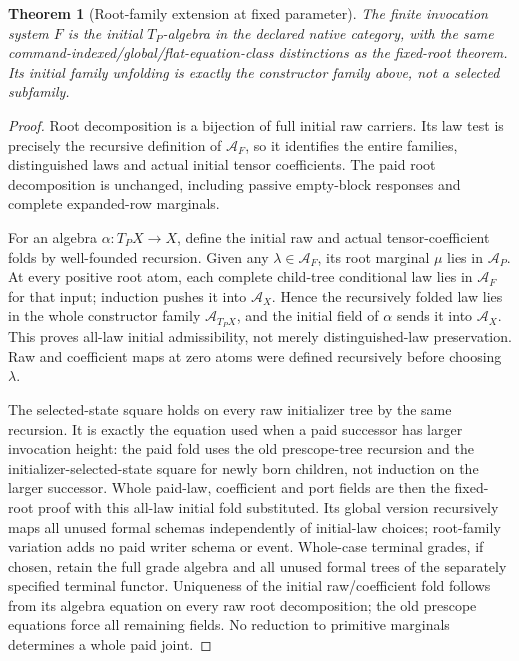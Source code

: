 \documentclass[11pt]{article}
\newtheorem{theorem}{Theorem}\newtheorem{lemma}[theorem]{Lemma}
\begin{document}
\begin{theorem}[Root-family extension at fixed parameter]
The finite invocation system $F$ is the initial $T_P$-algebra in the declared native category, with the same command-indexed/global/flat-equation-class distinctions as the fixed-root theorem. Its initial family unfolding is exactly the constructor family above, not a selected subfamily.
\end{theorem}
\begin{proof}
Root decomposition is a bijection of full initial raw carriers. Its law test is precisely the recursive definition of $\mathcal A_F$, so it identifies the entire families, distinguished laws and actual initial tensor coefficients. The paid root decomposition is unchanged, including passive empty-block responses and complete expanded-row marginals.

For an algebra $\alpha:T_PX\to X$, define the initial raw and actual tensor-coefficient folds by well-founded recursion. Given any $\lambda\in\mathcal A_F$, its root marginal $\mu$ lies in $\mathcal A_P$. At every positive root atom, each complete child-tree conditional law lies in $\mathcal A_F$ for that input; induction pushes it into $\mathcal A_X$. Hence the recursively folded law lies in the whole constructor family $\mathcal A_{T_PX}$, and the initial field of $\alpha$ sends it into $\mathcal A_X$. This proves all-law initial admissibility, not merely distinguished-law preservation. Raw and coefficient maps at zero atoms were defined recursively before choosing $\lambda$.

The selected-state square holds on every raw initializer tree by the same recursion. It is exactly the equation used when a paid successor has larger invocation height: the paid fold uses the old prescope-tree recursion and the initializer-selected-state square for newly born children, not induction on the larger successor. Whole paid-law, coefficient and port fields are then the fixed-root proof with this all-law initial fold substituted. Its global version recursively maps all unused formal schemas independently of initial-law choices; root-family variation adds no paid writer schema or event. Whole-case terminal grades, if chosen, retain the full grade algebra and all unused formal trees of the separately specified terminal functor. Uniqueness of the initial raw/coefficient fold follows from its algebra equation on every raw root decomposition; the old prescope equations force all remaining fields. No reduction to primitive marginals determines a whole paid joint.
\end{proof}
\end{document}
